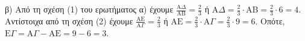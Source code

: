 β) Από τη σχέση (1) του ερωτήματος α) έχουμε $\frac{{\text{A}\Delta }}{{\text{AB}}} = \frac{2}{3}$ ή $\text{A}\Delta  = \frac{2}{3} \cdot \text{AB} = \frac{2}{3} \cdot 6 = 4$. Αντίστοιχα από τη σχέση (2) έχουμε $\frac{{\text{AE}}}{{\text{A}\Gamma }} = \frac{2}{3}$ ή $\text{AE} = \frac{2}{3} \cdot \text{A}\Gamma  = \frac{2}{3} \cdot 9 = 6$. Οπότε, $\text{E}\Gamma  = \text{A}\Gamma  - \text{AE} = 9 - 6 = 3$.